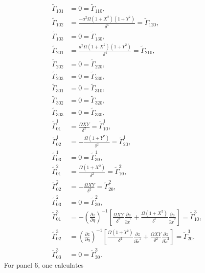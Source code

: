 \documentclass{article}
\begin{document}
\begin{align}
\tilde{\Gamma}_{101}&=0=\tilde{\Gamma}_{110}, \\
\tilde{\Gamma}_{102}&=\frac{-a^2\Omega (1+X^2)(1+Y^2)}{\delta^4}=\tilde{\Gamma}_{120}, \\
\tilde{\Gamma}_{103}&=0=\tilde{\Gamma}_{130}, \\
\tilde{\Gamma}_{201}&=\frac{a^2\Omega (1+X^2)(1+Y^2)}{\delta^4}=\tilde{\Gamma}_{210}, \\
\tilde{\Gamma}_{202}&=0=\tilde{\Gamma}_{220}, \\
\tilde{\Gamma}_{203}&=0=\tilde{\Gamma}_{230}, \\
\tilde{\Gamma}_{301}&=0=\tilde{\Gamma}_{310}, \\
\tilde{\Gamma}_{302}&=0=\tilde{\Gamma}_{320}, \\
\tilde{\Gamma}_{303}&=0=\tilde{\Gamma}_{330}, \\
\tilde{\Gamma}^1_{01}&=\frac{\Omega XY}{\delta^2}=\tilde{\Gamma}^1_{10}, \\
\tilde{\Gamma}^1_{02}&=-\frac{\Omega (1+Y^2)}{\delta^2}=\tilde{\Gamma}^1_{20}, \\
\tilde{\Gamma}^1_{03}&=0=\tilde{\Gamma}^1_{30}, \\
\tilde{\Gamma}^2_{01}&=\frac{\Omega (1+X^2)}{\delta^2}=\tilde{\Gamma}^2_{10}, \\
\tilde{\Gamma}^2_{02}&=-\frac{\Omega XY}{\delta^2}=\tilde{\Gamma}^2_{20}, \\
\tilde{\Gamma}^2_{03}&=0=\tilde{\Gamma}^2_{30}, \\
\tilde{\Gamma}^3_{01}&=-\left(\frac{\partial z}{\partial \eta}\right)^{-1}\left[ \frac{\Omega XY}{\delta^2} \frac{\partial z}{\partial \tilde{x}^1}+ \frac{\Omega (1+X^2)}{\delta^2} \frac{\partial z}{\partial \tilde{x}^2}  \right]=\tilde{\Gamma}^3_{10}, \\
\tilde{\Gamma}^3_{02}&=\left(\frac{\partial z}{\partial \eta}\right)^{-1}\left[ \frac{\Omega (1+Y^2)}{\delta^2} \frac{\partial z}{\partial \tilde{x}^1}+\frac{\Omega XY}{\delta^2}\frac{\partial z}{\partial \tilde{x}^2}  \right]=\tilde{\Gamma}^3_{20}, \\
\tilde{\Gamma}^3_{03}&=0=\tilde{\Gamma}^3_{30}.
\end{align}
For panel $6$, one calculates
\end{document}
